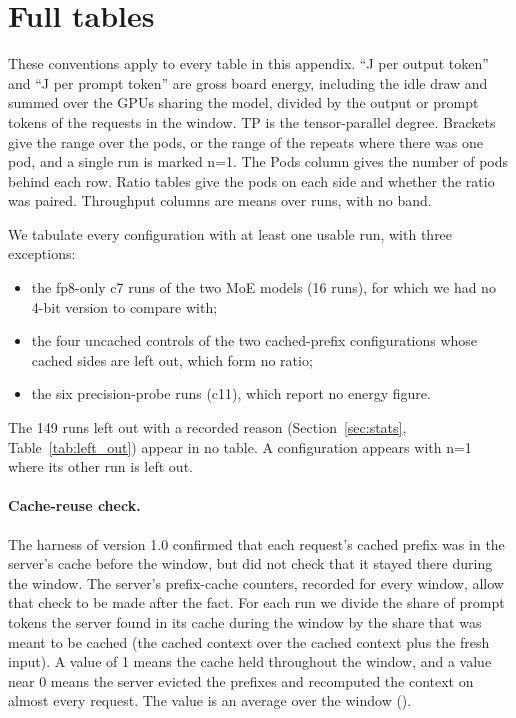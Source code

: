 \documentclass[11pt]{article}
\begin{document}
\section{Full tables}\label{app:tables}

These conventions apply to every table in this appendix. ``J per output token'' and ``J per prompt token'' are gross board energy, including the idle draw and summed over the GPUs sharing the model, divided by the output or prompt tokens of the requests in the window. TP is the tensor-parallel degree. Brackets give the range over the pods, or the range of the repeats where there was one pod, and a single run is marked n=1. The Pods column gives the number of pods behind each row. Ratio tables give the pods on each side and whether the ratio was paired. Throughput columns are means over runs, with no band.

We tabulate every configuration with at least one usable run, with three exceptions:
\begin{itemize}
\item the fp8-only c7 runs of the two MoE models (16 runs), for which we had no 4-bit version to compare with;
\item the four uncached controls of the two cached-prefix configurations whose cached sides are left out, which form no ratio;
\item the six precision-probe runs (c11), which report no energy figure.
\end{itemize}
The 149 runs left out with a recorded reason (Section~\ref{sec:stats}, Table~\ref{tab:left_out}) appear in no table. A configuration appears with n=1 where its other run is left out.

\paragraph{Cache-reuse check.} The harness of version 1.0 confirmed that each request's cached prefix was in the server's cache before the window, but did not check that it stayed there during the window. The server's prefix-cache counters, recorded for every window, allow that check to be made after the fact. For each run we divide the share of prompt tokens the server found in its cache during the window by the share that was meant to be cached (the cached context over the cached context plus the fresh input). A value of 1 means the cache held throughout the window, and a value near 0 means the server evicted the prefixes and recomputed the context on almost every request. The value is an average over the window ().
\end{document}
